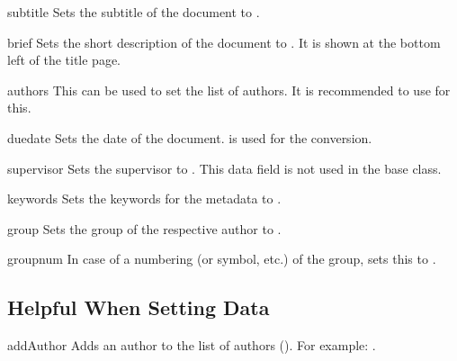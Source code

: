 \documentclass[useartcl,notoc]{sopra-paper}
\begin{document}
\begin{command}{subtitle}{}
    Sets the subtitle of the document to .
\end{command}

\begin{command}{brief}{}
    Sets the short description of the document to . It is shown at the bottom left of the title page.
\end{command}

\begin{command}{authors}{}
    This can be used to set the list of authors. It is recommended
    to use  for this.
\end{command}

\begin{command}{duedate}{}
   Sets the date of the document.  is used
   for the conversion.
\end{command}

\begin{command}{supervisor}{}
    Sets the supervisor to . This data field is not used in the base class.
\end{command}

\begin{command}{keywords}{}
    Sets the keywords for the metadata to .
\end{command}

\begin{command}{group}{}
    Sets the group of the respective author to .%
\end{command}

\begin{command}{groupnum}{}
    In case of a numbering (or symbol, etc.) of the group, sets this
    to .
\end{command}

\subsection{Helpful When Setting Data}
\begin{command}{addAuthor}{}
    Adds an author to the list of authors (). For
    example: .
\end{command}
\end{document}
